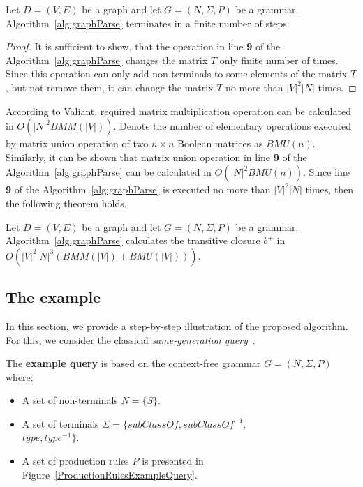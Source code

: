 \begin{mytheorem}\label{thm:finite}
 Let $D = (V,E)$ be a graph and let $G =(N,\Sigma,P)$ be a grammar. Algorithm~\ref{alg:graphParse} terminates in a finite number of steps. 
\end{mytheorem}
\begin{proof}
It is sufficient to show, that the operation in line \textbf{9} of the Algorithm~\ref{alg:graphParse} changes the matrix $T$ only finite number of times. Since this operation can only add non-terminals to some elements of the matrix $T$, but not remove them, it can change the matrix $T$ no more than $|V|^2|N|$ times.
\end{proof}

According to Valiant, required matrix multiplication operation can be calculated in $O(|N|^2 BMM(|V|))$. Denote the number of elementary operations executed by matrix union operation of two $n \times n$ Boolean matrices as $BMU(n)$. Similarly, it can be shown that matrix union operation in line \textbf{9} of the Algorithm~\ref{alg:graphParse} can be calculated in $O(|N|^2 BMU(n))$. Since line \textbf{9} of the Algorithm~\ref{alg:graphParse} is executed no more than $|V|^2|N|$ times, then the following theorem holds.

\begin{mytheorem}\label{thm:time}
 Let $D = (V,E)$ be a graph and let $G =(N,\Sigma,P)$ be a grammar. Algorithm~\ref{alg:graphParse} calculates the transitive closure $b^+$ in $O(|V|^2|N|^3(BMM(|V|) + BMU(|V|)))$.
\end{mytheorem}



\subsection{The example} \label{section_example}
In this section, we provide a step-by-step illustration of the proposed algorithm. For this, we consider the classical \textit{same-generation query}~\cite{FndDB}.

The \textbf{example query} is based on the context-free grammar $G = (N, \Sigma, P)$ where:
\begin{itemize}
    \item A set of non-terminals $N = \{S\}$.
    \item A set of terminals $\Sigma = \{subClassOf, subClassOf^{-1},$ \\ $type, type^{-1}\}$.
    \item A set of production rules $P$ is presented in Figure~\ref{ProductionRulesExampleQuery}.
\end{itemize}

